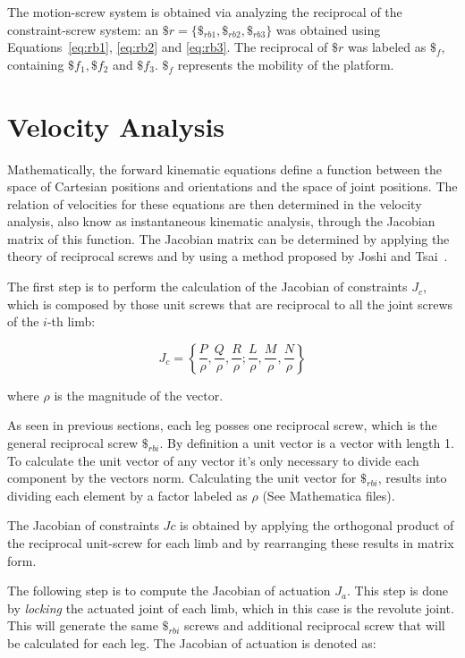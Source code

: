 \documentclass[titlepage, letterpaper]{article}
\begin{document}
The motion-screw system is obtained via analyzing the reciprocal of the constraint-screw system: an $\$r = \{\$_{rb1}, \$_{rb2}, \$_{rb3}\}$ was obtained using Equations~\ref{eq:rb1}, \ref{eq:rb2} and \ref{eq:rb3}.
The reciprocal of $\$r$ was labeled as $\$_{f}$, containing $\$f_1, \$f_2$ and $\$f_3$.
$\$_f$ represents the mobility of the platform.

\section{Velocity Analysis}
\label{sec:velocity}

Mathematically, the forward kinematic equations define a function between the space of Cartesian positions and orientations and the space of joint positions.
The relation of velocities for these equations are then determined in the velocity analysis, also know as instantaneous kinematic analysis, through the Jacobian matrix of this function.
The Jacobian matrix can be determined by applying the theory of reciprocal screws and by using a method proposed by Joshi and Tsai~\cite{Joshi02}.

The first step is to perform the calculation of the Jacobian of constraints $J_c$, which is composed by those unit screws that are reciprocal to all the joint screws of the $i$-th limb:

\begin{equation}
\label{eq:Jc}
    J_c =\left\{\frac{P}{\rho}, \frac{Q}{\rho}, \frac{R}{\rho} ; \frac{L}{\rho}, \frac{M}{\rho}, \frac{N}{\rho}\right\}
\end{equation}

where $\rho$ is the magnitude of the vector.

As seen in previous sections, each leg posses one reciprocal screw, which is the general reciprocal screw $\$_{rbi}$.
By definition a unit vector is a vector with length 1.
To calculate the unit vector of any vector it’s only necessary to divide each component by the vectors norm.
Calculating the unit vector for $\$_{rbi}$, results into dividing each element by a factor labeled as $\rho$ (See Mathematica files).

The Jacobian of constraints $Jc$ is obtained by applying the orthogonal product of the reciprocal unit-screw for each limb and by rearranging these results in matrix form.

The following step is to compute the Jacobian of actuation $J_a$.
This step is done by \textit{locking} the actuated joint of each limb,
which in this case is the revolute joint.
This will generate the same $\$_{rbi}$ screws and additional reciprocal screw that will be calculated for each leg.
The Jacobian of actuation is denoted as:
\end{document}
